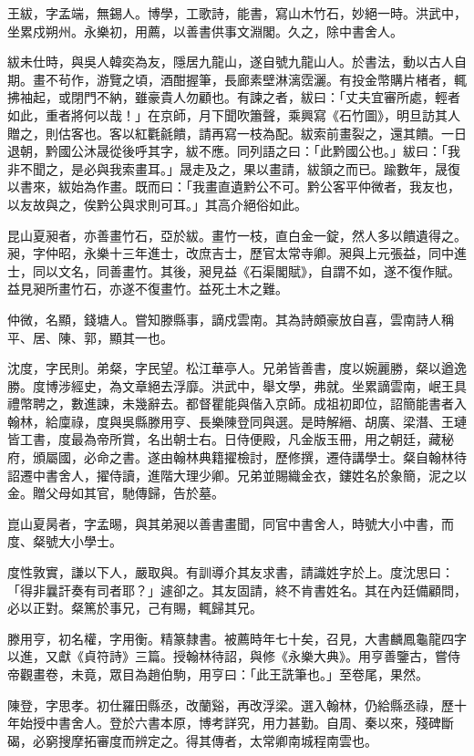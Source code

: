 \begin{pinyinscope}
王紱，字孟端，無錫人。博學，工歌詩，能書，寫山木竹石，妙絕一時。洪武中，坐累戍朔州。永樂初，用薦，以善書供事文淵閣。久之，除中書舍人。

紱未仕時，與吳人韓奕為友，隱居九龍山，遂自號九龍山人。於書法，動以古人自期。畫不茍作，游覽之頃，酒酣握筆，長廊素壁淋漓霑灑。有投金幣購片楮者，輒拂袖起，或閉門不納，雖豪貴人勿顧也。有諫之者，紱曰：「丈夫宜審所處，輕者如此，重者將何以哉！」在京師，月下聞吹簫聲，乘興寫《石竹圖》，明旦訪其人贈之，則估客也。客以紅氍毹饋，請再寫一枝為配。紱索前畫裂之，還其饋。一日退朝，黔國公沐晟從後呼其字，紱不應。同列語之曰：「此黔國公也。」紱曰：「我非不聞之，是必與我索畫耳。」晟走及之，果以畫請，紱頷之而已。踰數年，晟復以書來，紱始為作畫。既而曰：「我畫直遺黔公不可。黔公客平仲微者，我友也，以友故與之，俟黔公與求則可耳。」其高介絕俗如此。

昆山夏昶者，亦善畫竹石，亞於紱。畫竹一枝，直白金一錠，然人多以饋遺得之。昶，字仲昭，永樂十三年進士，改庶吉士，歷官太常寺卿。昶與上元張益，同中進士，同以文名，同善畫竹。其後，昶見益《石渠閣賦》，自謂不如，遂不復作賦。益見昶所畫竹石，亦遂不復畫竹。益死土木之難。

仲微，名顯，錢塘人。嘗知滕縣事，謫戍雲南。其為詩頗豪放自喜，雲南詩人稱平、居、陳、郭，顯其一也。

沈度，字民則。弟粲，字民望。松江華亭人。兄弟皆善書，度以婉麗勝，粲以遒逸勝。度博涉經史，為文章絕去浮靡。洪武中，舉文學，弗就。坐累謫雲南，岷王具禮幣聘之，數進諫，未幾辭去。都督瞿能與偕入京師。成祖初即位，詔簡能書者入翰林，給廩祿，度與吳縣滕用亨、長樂陳登同與選。是時解縉、胡廣、梁潛、王璉皆工書，度最為帝所賞，名出朝士右。日侍便殿，凡金版玉冊，用之朝廷，藏秘府，頒屬國，必命之書。遂由翰林典籍擢檢討，歷修撰，遷侍講學士。粲自翰林待詔遷中書舍人，擢侍讀，進階大理少卿。兄弟並賜織金衣，鏤姓名於象簡，泥之以金。贈父母如其官，馳傳歸，告於墓。

崑山夏昺者，字孟晹，與其弟昶以善書畫聞，同官中書舍人，時號大小中書，而度、粲號大小學士。

度性敦實，謙以下人，嚴取與。有訓導介其友求書，請識姓字於上。度沈思曰：「得非曩訐奏有司者耶？」遽卻之。其友固請，終不肯書姓名。其在內廷備顧問，必以正對。粲篤於事兄，己有賜，輒歸其兄。

滕用亨，初名權，字用衡。精篆隸書。被薦時年七十矣，召見，大書麟鳳龜龍四字以進，又獻《貞符詩》三篇。授翰林待詔，與修《永樂大典》。用亨善鑒古，嘗侍帝觀畫卷，未竟，眾目為趙伯駒，用亨曰：「此王詵筆也。」至卷尾，果然。

陳登，字思孝。初仕羅田縣丞，改蘭谿，再改浮梁。選入翰林，仍給縣丞祿，歷十年始授中書舍人。登於六書本原，博考詳究，用力甚勤。自周、秦以來，殘碑斷碣，必窮搜摩拓審度而辨定之。得其傳者，太常卿南城程南雲也。


\end{pinyinscope}
